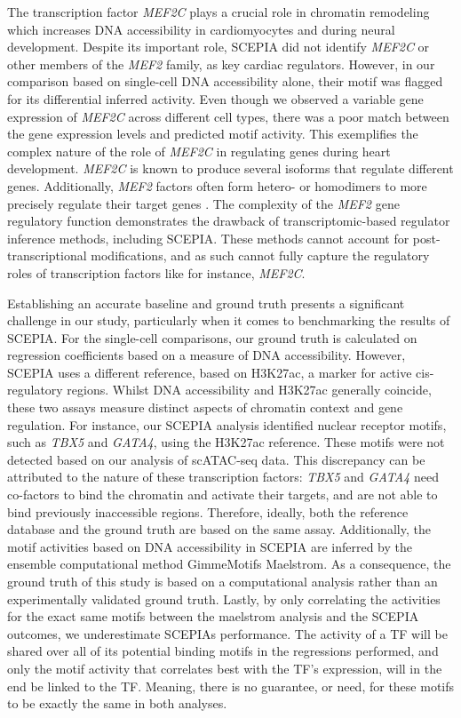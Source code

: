 The transcription factor \textit{MEF2C} plays a crucial role in chromatin remodeling which increases DNA accessibility in cardiomyocytes\cite{Stone2019,Ieda2010,Desjardins2016} and during neural development\cite{Li2008}. Despite its important role, SCEPIA did not identify \textit{MEF2C} or other members of the \textit{MEF2} family, as key cardiac regulators. However, in our comparison based on single-cell DNA accessibility alone, their motif was flagged for its differential inferred activity. Even though we observed a variable gene expression of \textit{MEF2C} across different cell types, there was a poor match between the gene expression levels and predicted motif activity. This exemplifies the complex nature of the role of \textit{MEF2C} in regulating genes during heart development. \textit{MEF2C} is known to produce several isoforms that regulate different genes\cite{Zhu2004}. Additionally, \textit{MEF2} factors often form hetero- or homodimers to more precisely regulate their target genes \cite{Desjardins2016,Black1998}. The complexity of the \textit{MEF2} gene regulatory function demonstrates the drawback of transcriptomic-based regulator inference methods, including SCEPIA. These methods cannot account for post-transcriptional modifications, and as such cannot fully capture the regulatory roles of transcription factors like for instance, \textit{MEF2C}.

Establishing an accurate baseline and ground truth presents a significant challenge in our study, particularly when it comes to benchmarking the results of SCEPIA. For the single-cell comparisons, our ground truth is calculated on regression coefficients based on a measure of DNA accessibility. However, SCEPIA uses a different reference, based on H3K27ac, a marker for active cis-regulatory regions. Whilst DNA accessibility and H3K27ac generally coincide, these two assays measure distinct aspects of chromatin context and gene regulation. For instance, our SCEPIA analysis identified nuclear receptor motifs, such as \textit{TBX5} and \textit{GATA4}, using the H3K27ac reference. These motifs were not detected based on our analysis of scATAC-seq data. This discrepancy can be attributed to the nature of these transcription factors: \textit{TBX5} and \textit{GATA4} need co-factors to bind the chromatin and activate their targets, and are not able to bind previously inaccessible regions\cite{Stone2019}. Therefore, ideally, both the reference database and the ground truth are based on the same assay. Additionally, the motif activities based on DNA accessibility in SCEPIA are inferred by the ensemble computational method GimmeMotifs Maelstrom\cite{Bruse_2018}. As a consequence, the ground truth of this study is based on a computational analysis rather than an experimentally validated ground truth. Lastly, by only correlating the activities for the exact same motifs between the maelstrom analysis and the SCEPIA outcomes, we underestimate SCEPIAs performance. The activity of a TF will be shared over all of its potential binding motifs in the regressions performed, and only the motif activity that correlates best with the TF's expression, will in the end be linked to the TF. Meaning, there is no guarantee, or need, for these motifs to be exactly the same in both analyses.

